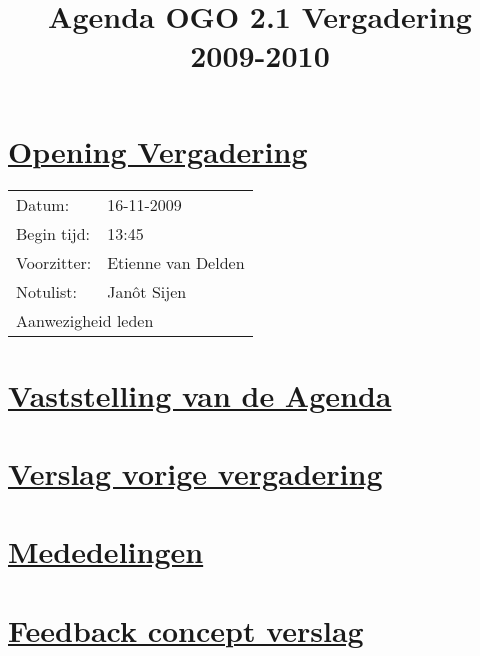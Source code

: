 \documentclass[a4paper]{article}
\title{Agenda OGO 2.1 Vergadering 2009-2010}
\date{}
\begin{document}
\ifpdf
{}
\else
{}
\fi

\maketitle

\section{\underline{Opening Vergadering}} %
\label{sec:opening_vergadering}
\begin{tabular}{ll}
  Datum:      & 16-11-2009\\
  Begin tijd: & 13:45\\
  Voorzitter: & Etienne van Delden\\
  Notulist:   & Jan\^ot Sijen\\
  \multicolumn{2}{l}{Aanwezigheid leden}
\end{tabular}



\section{\underline{Vaststelling van de Agenda}} %
\label{sec:vaststelling_van_de_agenda}


\section{\underline{Verslag vorige vergadering}} %
\label{sec:bespreking_van_de_vorige_notulen}


\section{\underline{Mededelingen}} %
\label{sec:mededelingen}

\section{\underline{Feedback concept verslag}} %
\label{sec:feedback concept verslag}

\end{document}
